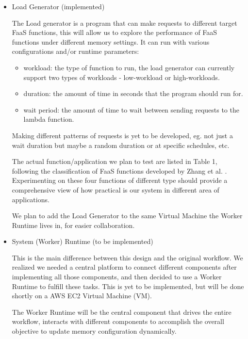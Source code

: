 \documentclass[conference]{IEEEtran}
\begin{document}
\begin{itemize}
\item Load Generator (implemented)

The Load generator is a program that can make requests to different target FaaS functions, this will allow us to explore the performance of FaaS functions under different memory settings. It can run with various configurations and/or runtime parameters:
\begin{itemize}
    \item workload: the type of function to run, the load generator can currently support two types of workloads - low-workload or high-workloads.
    \item duration: the amount of time in seconds that the program should run for.
    \item wait period: the amount of time to wait between sending requests to the lambda function.
\end{itemize}

Making different patterns of requests is yet to be developed, eg. not just a wait duration but maybe a random duration or at specific schedules, etc.

The actual function/application we plan to test are listed in Table 1, following the classification of FaaS functions developed by Zhang et al. \cite{10.1007/978-3-030-96326-2_2}. Experimenting on these four functions of different type should provide a comprehensive view of how practical is our system in different area of applications.

We plan to add the Load Generator to the same Virtual Machine the Worker Runtime lives in, for easier collaboration.


\item System (Worker) Runtime (to be implemented)

This is the main difference between this design and the original workflow. We realized we needed a central platform to connect different components after implementing all those components, and then decided to use a Worker Runtime to fulfill these tasks. This is yet to be implemented, but will be done shortly on a AWS EC2 Virtual Machine (VM).

The Worker Runtime will be the central component that drives the entire workflow, interacts with different components to accomplish the overall objective to update memory configuration dynamically. 


\end{itemize}
\end{document}
